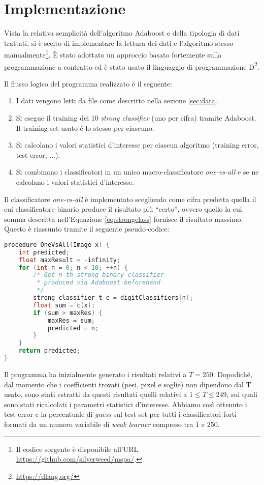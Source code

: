 

\section{Implementazione}
Vista la relativa semplicit\`a dell'algoritmo Adaboost e della tipologia di dati trattati, si \`e scelto di implementare la lettura dei dati e l'algoritmo stesso manualmente\footnote{Il codice sorgente \`e disponibile all'URL \url{https://github.com/silverweed/mspa/}.}. \`E stato adottato un approccio basato fortemente sulla programmazione a contratto ed \`e stato usato il linguaggio di programmazione D\footnote{\url{https://dlang.org/}}.

Il flusso logico del programma realizzato \`e il seguente:
\begin{enumerate}
\item I dati vengono letti da file come descritto nella sezione \ref{sec:data}.
\item Si esegue il training dei 10 {\it strong classifier} (uno per cifra) tramite Adaboost. Il training set usato \`e lo stesso per ciascuno.
\item Si calcolano i valori statistici d'interesse per ciascun algoritmo (training error, test error, ...).
\item Si combinano i classificatori in un unico macro-classificatore {\it one-vs-all} e se ne calcolano i valori statistici d'interesse.
\end{enumerate}

Il classificatore {\it one-vs-all} \`e implementato scegliendo come cifra predetta quella il cui classificatore binario produce il risultato pi\`u ``certo'', ovvero quello la cui somma descritta nell'Equazione \ref{eq:strongclass} fornisce il risultato massimo. Questo \`e riassunto tramite il seguente pseudo-codice:

\pagebreak
\begin{lstlisting}[language=c]
procedure OneVsAll(Image x) {
    int predicted;
    float maxResult = -infinity;
    for (int n = 0; n < 10; ++n) {
        /* Get n-th strong binary classifier
         * produced via Adaboost beforehand
         */
        strong_classifier_t c = digitClassifiers[n];
        float sum = c(x);
        if (sum > maxRes) {
            maxRes = sum;
            predicted = n;
        }
    }
    return predicted;
}
\end{lstlisting}

Il programma ha inizialmente generato i risultati relativi a \(T = 250\). Dopodich\'e, dal momento che i coefficienti trovati (pesi, pixel e soglie) non dipendono dal T usato, sono stati estratti da questi risultati quelli relativi a \(1 \le T \le 249\), sui quali sono stati ricalcolati i parametri statistici d'interesse. Abbiamo cos\`i ottenuto i test error e la percentuale di {\it guess} sul test set per tutti i classificatori forti formati da un numero variabile di {\it weak learner} compreso tra 1 e 250.
